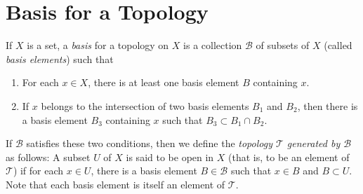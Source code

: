 \section{Basis for a Topology}
\begin{definition}
  If $X$ is a set, a \emph{basis} for a topology on $X$ is a
  collection $\mathcal{B}$ of subsets of $X$ (called \emph{basis
    elements}) such that
  \begin{enumerate}[(1)]
  \item For each $x\in X$, there is at least one basis element
    $B$ containing $x$.
  \item If $x$ belongs to the intersection of two basis elements
    $B_1$ and $B_2$, then there is a basis element $B_3$
    containing $x$ such that $B_3\subset B_1\cap B_2$.
  \end{enumerate}
  If $\mathcal{B}$ satisfies these two conditions, then we define
  the \emph{topology $\mathcal{T}$ generated by $\mathcal{B}$} as
  follows: A subset $U$ of $X$ is said to be open in $X$ (that
  is, to be an element of $\mathcal{T}$) if for each $x\in U$,
  there is a basis element $B\in\mathcal{B}$ such that $x\in B$
  and $B\subset U$. Note that each basis element is itself an
  element of $\mathcal{T}$.
\end{definition}


